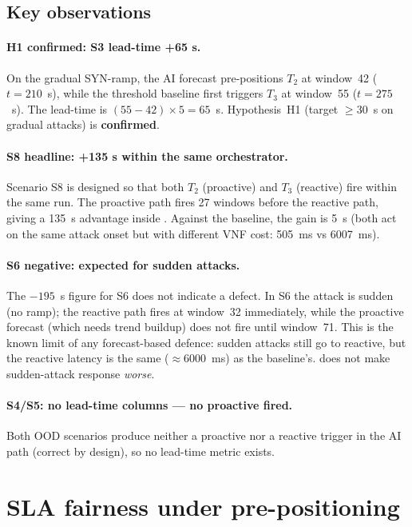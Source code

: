 \subsection{Key observations}

\paragraph{H1 confirmed: S3 lead-time +65 s.}
On the gradual SYN-ramp, the AI forecast pre-positions $T_2$ at
window~42 ($t = 210$~s), while the threshold baseline first triggers
$T_3$ at window~55 ($t = 275$~s). The lead-time is
$(55 - 42) \times 5 = 65$~s. Hypothesis~H1 (target $\geq 30$~s on
gradual attacks) is \textbf{confirmed}.

\paragraph{S8 headline: +135 s within the same orchestrator.}
Scenario S8 is designed so that both $T_2$ (proactive) and $T_3$
(reactive) fire within the same run. The proactive path fires 27 windows
before the reactive path, giving a 135~s advantage inside \padonap{}.
Against the baseline, the gain is 5~s (both act on the same attack onset
but with different VNF cost: 505~ms vs 6007~ms).

\paragraph{S6 negative: expected for sudden attacks.}
The $-195$~s figure for S6 does not indicate a defect. In S6 the
attack is sudden (no ramp); the reactive path fires at window~32
immediately, while the proactive forecast (which needs trend buildup)
does not fire until window~71. This is the known limit of any
forecast-based defence: sudden attacks still go to reactive, but the
reactive latency is the same ($\approx 6000$~ms) as the baseline's.
\padonap{} does not make sudden-attack response \emph{worse}.

\paragraph{S4/S5: no lead-time columns --- no proactive fired.}
Both OOD scenarios produce neither a proactive nor a reactive trigger
in the AI path (correct by design), so no lead-time metric exists.

\section{SLA fairness under pre-positioning}
\label{sec:sla-fairness}

